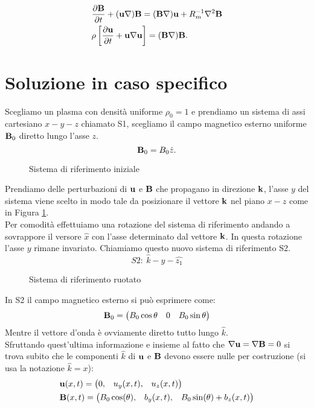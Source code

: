 \begin{align}
    & \pd{\vv{B}} + (\vv{u}\nabla) \vv{B} = (\vv{B} \nabla) \vv{u} + R_m^{-1} \nabla^2 \vv{B} \label{eq:mod1}\\
     & \rho \left[\pd{\vv{u}} + \vv{u} \nabla \vv{u}\right] = (\vv{B}\nabla)\vv{B}.\label{eq:mod2}
\end{align}

\section{Soluzione in caso specifico}
Scegliamo un plasma con densità uniforme $\rho_0 = 1$ e prendiamo un sistema di assi cartesiano $x-y-z$ chiamato S1, scegliamo il campo magnetico esterno uniforme $\vv{B}_0$ diretto lungo l'asse $z$.
\[
    \vv{B}_0 = B_0 \hat{z}.
\]
\begin{figure}[H]
    \centering
    
    \caption{Sistema di riferimento iniziale}
    \label{fig:sis_in}
\end{figure}
\noindent
Prendiamo delle perturbazioni di $\vv{u}$ e $\vv{B}$ che propagano in direzione $\vv{k}$, l'asse $y$ del sistema viene scelto in modo tale da posizionare il vettore $\vv{k}$ nel piano $x-z$ come in Figura \ref{fig:sis_in}.\\
Per comodità effettuiamo una rotazione del sistema di riferimento andando a sovrappore il versore $\hat{x}$ con l'asse determinato dal vettore $\vv{k}$. In questa rotazione l'asse $y$ rimane invariato. Chiamiamo questo nuovo sistema di riferimento S2.
\[S2: \ \hat{k}-\hat{y}-\hat{z_1} \]
\begin{figure}[H]
    \centering
    
    \caption{Sistema di riferimento ruotato}
    \label{fig:sis_fin}
\end{figure}
In S2 il campo magnetico esterno si può esprimere come:
\[
    \vv{B}_0 =
    \begin{pmatrix}
        B_0 \cos\theta &
        0              &
        B_0 \sin\theta\end{pmatrix}
\]
Mentre il vettore d'onda è ovviamente diretto tutto lungo $\hat{k}$.\\
Sfruttando quest'ultima informazione e insieme al fatto che $\nabla \vv{u} = \nabla \vv{B} = 0$ si trova subito che le componenti $\hat{k}$ di $\vv{u}$ e $\vv{B}$ devono essere nulle per costruzione (si usa la notazione $\hat{k} = x$):
\begin{align*}
     & \vv{u}(x, t) = \begin{pmatrix}
                          0, & u_{y}(x, t), & u_{z}(x, t)
                      \end{pmatrix}                                   \\
     & \vv{B}(x, t) = \begin{pmatrix}
                          B_0 \cos(\theta), & b_{y}(x, t), & B_0 \sin(\theta) + b_{z}(x, t)
                      \end{pmatrix}
\end{align*}
